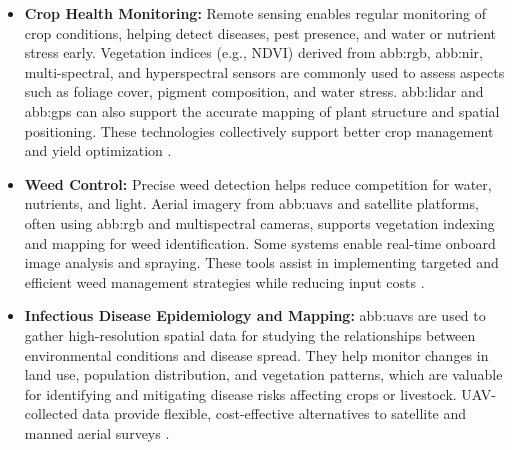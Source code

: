 \begin{itemize}[leftmargin=1.5em]

    \item \textbf{Crop Health Monitoring:} Remote sensing enables regular monitoring of crop conditions, helping detect diseases, pest presence, and water or nutrient stress early. Vegetation indices (e.g., NDVI) derived from \gls{abb:rgb}, \gls{abb:nir}, multi-spectral, and hyperspectral sensors are commonly used to assess aspects such as foliage cover, pigment composition, and water stress. \gls{abb:lidar} and \gls{abb:gps} can also support the accurate mapping of plant structure and spatial positioning. These technologies collectively support better crop management and yield optimization \parencite{phang2023satellite}.
    
    \item \textbf{Weed Control:} Precise weed detection helps reduce competition for water, nutrients, and light. Aerial imagery from \gls{abb:uav}s and satellite platforms, often using \gls{abb:rgb} and multispectral cameras, supports vegetation indexing and mapping for weed identification. Some systems enable real-time onboard image analysis and spraying. These tools assist in implementing targeted and efficient weed management strategies while reducing input costs \parencite{phang2023satellite}.
    
    \item \textbf{Infectious Disease Epidemiology and Mapping:} \gls{abb:uav}s are used to gather high-resolution spatial data for studying the relationships between environmental conditions and disease spread. They help monitor changes in land use, population distribution, and vegetation patterns, which are valuable for identifying and mitigating disease risks affecting crops or livestock. UAV-collected data provide flexible, cost-effective alternatives to satellite and manned aerial surveys \parencite{phang2023satellite}.
    
    
\end{itemize}


